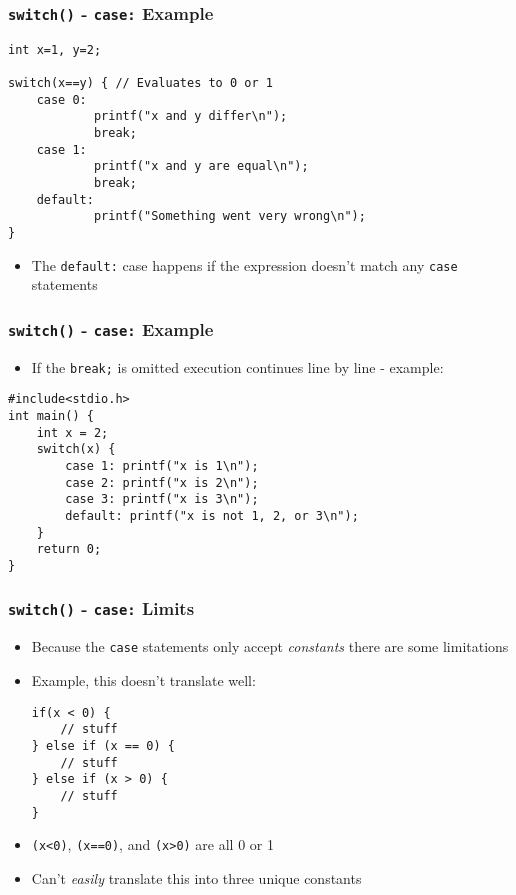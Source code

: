 \documentclass[14pt]{beamer}
\begin{document}
\begin{frame}[fragile]
\frametitle{\texttt{switch()} - \texttt{case:} Example}
\begin{lstlisting}[style=CStyle]
int x=1, y=2;

switch(x==y) { // Evaluates to 0 or 1
	case 0:
			printf("x and y differ\n");
			break;
	case 1:
			printf("x and y are equal\n");
			break;
	default:
			printf("Something went very wrong\n");
}
\end{lstlisting}
\begin{itemize}
\item The \texttt{default:} case happens if the expression doesn't match any \texttt{case} statements
\end{itemize}
\end{frame}

\begin{frame}[fragile]
\frametitle{\texttt{switch()} - \texttt{case:} Example}
\begin{itemize}
\item If the \texttt{break;} is omitted execution continues line by line - example:
\end{itemize}
\begin{lstlisting}[style=CStyle]
#include<stdio.h>
int main() {
	int x = 2;
	switch(x) {
		case 1: printf("x is 1\n");
		case 2: printf("x is 2\n");
		case 3: printf("x is 3\n");
		default: printf("x is not 1, 2, or 3\n");
	}
	return 0;
}
\end{lstlisting}
\end{frame}

\begin{frame}[fragile]
\frametitle{\texttt{switch()} - \texttt{case:} Limits}
\begin{itemize}
\item Because the \texttt{case} statements only accept \textit{constants} there are some limitations
\item Example, this doesn't translate well:
\begin{lstlisting}[style=CStyle]
if(x < 0) {
	// stuff
} else if (x == 0) {
	// stuff
} else if (x > 0) {
	// stuff
}
\end{lstlisting}
\item \texttt{(x<0)}, \texttt{(x==0)}, and \texttt{(x>0)} are all 0 or 1
\item Can't \textit{easily} translate this into three unique constants
\end{itemize}
\end{frame}
\end{document}
